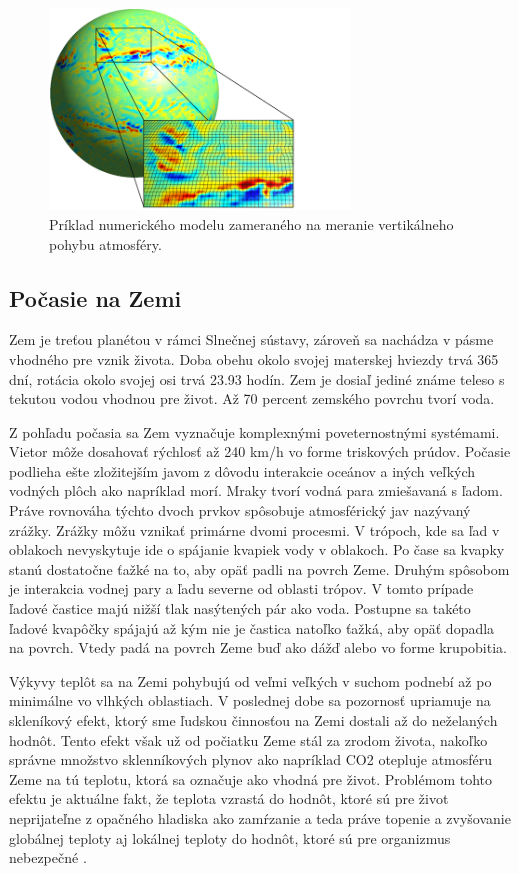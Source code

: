\begin{figure}[!htbp]
  \centering
  \includegraphics[width=8cm]{img/numerical_prediction_model.png}
  \caption{Príklad numerického modelu zameraného na meranie vertikálneho pohybu atmosféry.}
  \label{numModel}
\end{figure}

\subsection{Počasie na Zemi}
Zem je treťou planétou v rámci Slnečnej sústavy, zároveň sa nachádza v pásme vhodného pre vznik života. Doba obehu okolo svojej materskej hviezdy trvá 365 dní, rotácia okolo svojej osi trvá 23.93 hodín. Zem je dosiaľ jediné známe teleso s tekutou vodou vhodnou pre život. Až 70 percent zemského povrchu tvorí voda.

Z pohľadu počasia sa Zem vyznačuje komplexnými poveternostnými systémami. Vietor môže dosahovať rýchlosť až 240 km/h vo forme triskových prúdov. Počasie podlieha ešte zložitejším javom z dôvodu interakcie oceánov a iných veľkých vodných plôch ako napríklad morí. Mraky tvorí vodná para zmiešavaná s ľadom. Práve rovnováha týchto dvoch prvkov spôsobuje atmosférický jav nazývaný zrážky. Zrážky môžu vznikať primárne dvomi procesmi. V trópoch, kde sa ľad v oblakoch nevyskytuje ide o spájanie kvapiek vody v oblakoch. Po čase sa kvapky stanú dostatočne ťažké na to, aby opäť padli na povrch Zeme. Druhým spôsobom je interakcia vodnej pary a ľadu severne od oblasti trópov. V tomto prípade ľadové častice majú nižší tlak nasýtených pár ako voda. Postupne sa takéto ľadové kvapôčky spájajú až kým nie je častica natoľko ťažká, aby opäť dopadla na povrch. Vtedy padá na povrch Zeme buď ako dážď alebo vo forme krupobitia.

Výkyvy teplôt sa na Zemi pohybujú od veľmi veľkých v suchom podnebí až po minimálne vo vlhkých oblastiach. V poslednej dobe sa pozornosť upriamuje na skleníkový efekt, ktorý sme ľudskou činnosťou na Zemi dostali až do neželaných hodnôt. Tento efekt však už od počiatku Zeme stál za zrodom života, nakoľko správne množstvo sklenníkových plynov ako napríklad CO2 otepluje atmosféru Zeme na tú teplotu, ktorá sa označuje ako vhodná pre život. Problémom tohto efektu je aktuálne fakt, že teplota vzrastá do hodnôt, ktoré sú pre život neprijateľne z opačného hladiska ako zamŕzanie a teda práve topenie a zvyšovanie globálnej teploty aj lokálnej teploty do hodnôt, ktoré sú pre organizmus nebezpečné \cite{meteo}.

